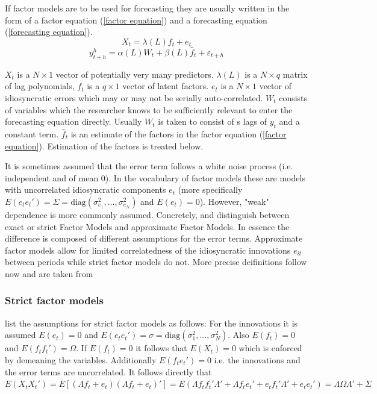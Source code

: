 \documentclass[12pt]{article}
\begin{document}
If factor models are to be used for forecasting they are usually written in the form of a factor equation (\ref{factor equation}) and a forecasting equation (\ref{forecasting equation}).
\begin{equation}
	\label{factor equation}
	X_t = \lambda(L) f_t + e_t
\end{equation}
\begin{equation}
	\label{forecasting equation}
	y^h_{t+h} = \alpha(L) W_t + \beta(L) \hat f_t + \varepsilon_{t+h}
\end{equation}
	
$X_t$ is a $N \times 1$ vector of potentially very many predictors. $\lambda(L)$ is a $N \times q$ matrix of lag polynomials, $f_t$ is a $q \times 1$ vector of latent factors. $e_t$ is a $N \times 1$ vector of idiosyncratic errors which may or may not be serially auto-correlated. $W_t$ consists of variables which the researcher knows to be sufficiently relevant to enter the forecasting equation directly. Usually $W_t$ is taken to consist of s lags of $y_t$ and a constant term. $\hat f_t$ is an estimate of the factors in the factor equation (\ref{factor equation}). Estimation of the factors is treated below.

It is sometimes assumed that the error term follows a white noise process (i.e. independent and of mean 0). In the vocabulary of factor models these are models with uncorrelated idiosyncratic components $e_t$ (more specifically $E(e_t e_t') = \Sigma = \text{diag}(\sigma_{e_1}^2, ..., \sigma_{e_N}^2)$ and $E(e_t) = 0$).
However, "weak" dependence is more commonly assumed. Concretely, \citet{geweke1977dynamic} and \citet{sargent1977business} distinguish between exact or strict Factor Models and approximate Factor Models. In essence the difference is composed of different assumptions for the error terms. Approximate factor models allow for limited correlatedness of the idiosyncratic innovations $e_{it}$ between periods while strict factor models do not. More precise deifinitions follow now and are taken from \citet{breitung2006dynamic}
\subsubsection*{Strict factor models}
\citet{breitung2006dynamic} list the assumptions for strict factor models as follows: For the innovations it is assumed $E(e_t) = 0$ and $E(e_te_t') = \sigma = \text{diag}(\sigma_1^2, ..., \sigma_N^2)$. Also $E(f_t) = 0$ and $E(f_tf_t') = \Omega$. If $E(f_t) = 0$ it follows that $E(X_t) = 0$ which is enforced by demeaning the variables. Additionally $E(f_t e_t') = 0$ i.e. the innovations and the error terms are uncorrelated. It follows directly that $E(X_tX_t') = E[(\Lambda f_t +e_t) (\Lambda f_t + e_t)'] = E(\Lambda f_t f_t' \Lambda' + \Lambda f_t e_t' + e_t f_t' \Lambda' + e_t e_t') = \Lambda \Omega \Lambda' + \Sigma$ 
\end{document}
